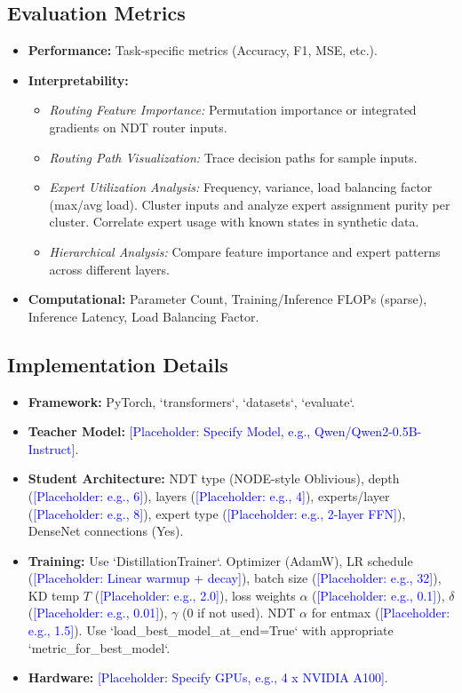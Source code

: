 \documentclass[11pt,a4paper]{article}
\newcommand{\placeholder}[1]{\textcolor{blue}{[Placeholder: #1]}}
\begin{document}
\subsection{Evaluation Metrics}
\begin{itemize}
    \item \textbf{Performance:} Task-specific metrics (Accuracy, F1, MSE, etc.).
    \item \textbf{Interpretability:}
        \begin{itemize}
            \item \textit{Routing Feature Importance:} Permutation importance or integrated gradients on NDT router inputs.
            \item \textit{Routing Path Visualization:} Trace decision paths for sample inputs.
            \item \textit{Expert Utilization Analysis:} Frequency, variance, load balancing factor (max/avg load). Cluster inputs and analyze expert assignment purity per cluster. Correlate expert usage with known states in synthetic data.
            \item \textit{Hierarchical Analysis:} Compare feature importance and expert patterns across different layers.
        \end{itemize}
    \item \textbf{Computational:} Parameter Count, Training/Inference FLOPs (sparse), Inference Latency, Load Balancing Factor.
\end{itemize}

\subsection{Implementation Details}
\begin{itemize}
    \item \textbf{Framework:} PyTorch, `transformers`, `datasets`, `evaluate`.
    \item \textbf{Teacher Model:} \placeholder{Specify Model, e.g., Qwen/Qwen2-0.5B-Instruct}.
    \item \textbf{Student Architecture:} NDT type (NODE-style Oblivious), depth (\placeholder{e.g., 6}), layers (\placeholder{e.g., 4}), experts/layer (\placeholder{e.g., 8}), expert type (\placeholder{e.g., 2-layer FFN}), DenseNet connections (Yes).
    \item \textbf{Training:} Use `DistillationTrainer`. Optimizer (AdamW), LR schedule (\placeholder{Linear warmup + decay}), batch size (\placeholder{e.g., 32}), KD temp $T$ (\placeholder{e.g., 2.0}), loss weights $\alpha$ (\placeholder{e.g., 0.1}), $\delta$ (\placeholder{e.g., 0.01}), $\gamma$ (0 if not used). NDT $\alpha$ for entmax (\placeholder{e.g., 1.5}). Use `load_best_model_at_end=True` with appropriate `metric_for_best_model`.
    \item \textbf{Hardware:} \placeholder{Specify GPUs, e.g., 4 x NVIDIA A100}.
\end{itemize}
\end{document}
